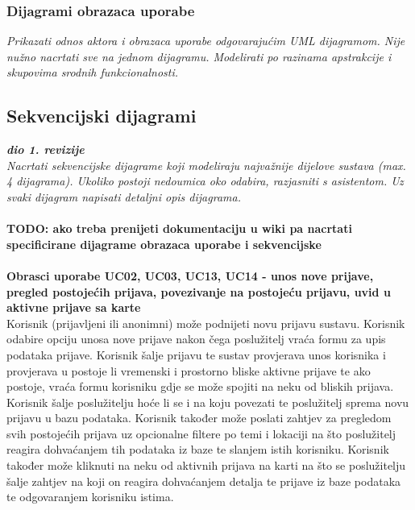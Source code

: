 					
				
				
					
				\subsubsection{Dijagrami obrazaca uporabe}
					
					\textit{Prikazati odnos aktora i obrazaca uporabe odgovarajućim UML dijagramom. Nije nužno nacrtati sve na jednom dijagramu. Modelirati po razinama apstrakcije i skupovima srodnih funkcionalnosti.}
				\eject		
				
			\subsection{Sekvencijski dijagrami}
				
				\textbf{\textit{dio 1. revizije}}\\
				
				
				\textit{Nacrtati sekvencijske dijagrame koji modeliraju najvažnije dijelove sustava (max. 4 dijagrama). Ukoliko postoji nedoumica oko odabira, razjasniti s asistentom. Uz svaki dijagram napisati detaljni opis dijagrama.}
				\\
				\\
				\textbf{TODO: ako treba prenijeti dokumentaciju u wiki pa nacrtati specificirane dijagrame obrazaca uporabe i sekvencijske}
				\\
				\\
				\textbf{Obrasci uporabe UC02, UC03, UC13, UC14 - unos nove prijave, pregled postojećih prijava, povezivanje na postojeću prijavu, uvid u aktivne prijave sa karte}\\
				Korisnik (prijavljeni ili anonimni) može podnijeti novu prijavu sustavu. Korisnik odabire opciju unosa nove prijave nakon čega poslužitelj vraća formu za upis podataka prijave. 
				Korisnik šalje prijavu te sustav provjerava unos korisnika i provjerava u postoje li vremenski i prostorno bliske aktivne prijave te ako postoje, vraća formu korisniku gdje se može spojiti na neku od bliskih prijava. 
				Korisnik šalje poslužitelju hoće li se i na koju povezati te poslužitelj sprema novu prijavu u bazu podataka. Korisnik također može poslati zahtjev za pregledom svih postojećih prijava uz opcionalne filtere po temi i lokaciji na što poslužitelj reagira dohvaćanjem tih podataka iz baze te slanjem istih korisniku. 
				Korisnik također može kliknuti na neku od aktivnih prijava na karti na što se poslužitelju šalje zahtjev na koji on reagira dohvaćanjem detalja te prijave iz baze podataka te odgovaranjem korisniku istima.
				
